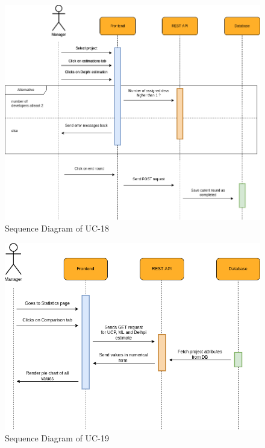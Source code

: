         \begin{figure}[H]
            \centering
            \includegraphics[scale=0.5]{./diagrams/sequence/seq-18.png}
            \caption{Sequence Diagram of UC-18}
            \label{fig:seq-18}
            
        \end{figure}
    

        \begin{figure}[H]
            \centering
            \includegraphics[scale=0.5]{./diagrams/sequence/seq-19.png}
            \caption{Sequence Diagram of UC-19}
            \label{fig:seq-19}
            
        \end{figure}
    
